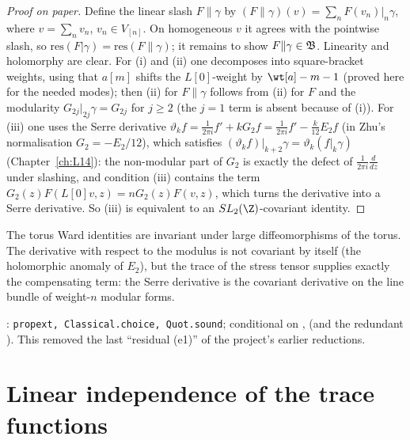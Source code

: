 \begin{proof}[Proof on paper]
Define the linear slash $F\|\gamma$ by $(F\|\gamma)(v)=\sum_n F(v_n)|_n\gamma$, where $v=\sum_nv_n$, $v_n\in V_{[n]}$. On
homogeneous $v$ it agrees with the pointwise slash, so $\mathrm{res}(F|\gamma)=\mathrm{res}(F\|\gamma)$; it remains to show
$F\|\gamma\in\mathfrak{B}$. Linearity and holomorphy are clear. For (i) and (ii) one decomposes into square-bracket weights,
using that $a[m]$ shifts the $L[0]$-weight by $\wt[a]-m-1$ (proved here for the needed modes); then (ii) for $F\|\gamma$ follows
from (ii) for $F$ and the modularity $G_{2j}|_{2j}\gamma=G_{2j}$ for $j\ge2$ (the $j=1$ term is absent because of (i)).
For (iii) one uses the Serre derivative $\vartheta_kf=\frac1{2\pi i}f'+kG_2f=\frac1{2\pi i}f'-\frac{k}{12}E_2f$ (in Zhu's normalisation $G_2=-E_2/12$),
which satisfies $(\vartheta_kf)|_{k+2}\gamma=\vartheta_k(f|_k\gamma)$ (Chapter~\ref{ch:L14}): the non-modular part of
$G_2$ is exactly the defect of $\frac1{2\pi i}\frac{d}{dz}$ under slashing, and condition (iii) contains the term
$G_2(z)F(L[0]v,z)=nG_2(z)F(v,z)$, which turns the derivative into a Serre derivative. So (iii) is equivalent to an
$\lfifteenSL$-covariant identity.
\end{proof}

\begin{physics}
The torus Ward identities are invariant under large diffeomorphisms of the torus. The derivative with respect to the
modulus is not covariant by itself (the holomorphic anomaly of $E_2$), but the trace of the stress tensor supplies exactly
the compensating term: the Serre derivative is the covariant derivative on the line bundle of weight-$n$ modular forms.
\end{physics}

\begin{status}
\allowbreak{}\allowbreak{}: \texttt{propext, Classical.choice, Quot.sound}; conditional on
,  (and the redundant ). This removed the last ``residual (e1)'' of the
project's earlier reductions.
\end{status}

\section{Linear independence of the trace functions}\label{l15:sec:independence}


